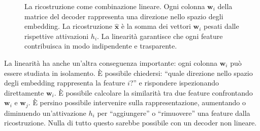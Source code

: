 \begin{figure}[htbp]
    \centering
    \caption{La ricostruzione come combinazione lineare. Ogni colonna $\mathbf{w}_i$ della matrice del decoder rappresenta una direzione nello spazio degli embedding. La ricostruzione $\hat{\mathbf{x}}$ è la somma dei vettori $\mathbf{w}_i$ pesati dalle rispettive attivazioni $h_i$. La linearità garantisce che ogni feature contribuisca in modo indipendente e trasparente.}
    \label{fig:decoder_linear_combination}
\end{figure}

La linearità ha anche un'altra conseguenza importante: ogni colonna $\mathbf{w}_i$ può essere studiata in isolamento. È possibile chiedersi: ``quale direzione nello spazio degli embedding rappresenta la feature $i$?'' e rispondere ispezionando direttamente $\mathbf{w}_i$. È possibile calcolare la similarità tra due feature confrontando $\mathbf{w}_i$ e $\mathbf{w}_j$. È persino possibile intervenire sulla rappresentazione, aumentando o diminuendo un'attivazione $h_i$ per ``aggiungere'' o ``rimuovere'' una feature dalla ricostruzione. Nulla di tutto questo sarebbe possibile con un decoder non lineare.

